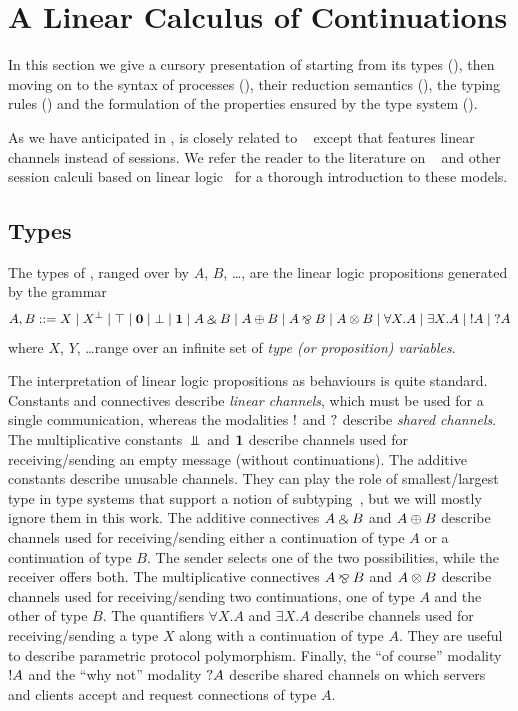 \section{A Linear Calculus of Continuations}
\label{sec:calculus}

In this section we give a cursory presentation of \Calculus starting from its
types (), then moving on to the syntax of processes
(), their reduction semantics (), the
typing rules () and the formulation of the properties
ensured by the type system ().

As we have anticipated in , \Calculus is closely related
to \CP~\citep{Wadler14,GayVasconcelos25} except that \Calculus features linear
channels instead of sessions.
%
We refer the reader to the literature on
\CP~\cite{Wadler14,LindleyMorris15,GayVasconcelos25} and other session calculi
based on linear logic~\cite{CairesPfenning10,CairesPfenningToninho16} for a
thorough introduction to these models.

\subsection{Types}
\label{sec:types}

The types of \Calculus, ranged over by $A$, $B$, \dots, are the linear logic
propositions generated by the grammar
\[
    A, B ::= X \mid \dual{X} \mid \Top \mid \Zero \mid \Bot \mid \One \mid A \With B \mid A \Plus B \mid A \Par B \mid A \Ten B \mid \forall X.A \mid \exists X.A \mid \OfCourse A \mid \WhyNot A
\]
where $X$, $Y$, \dots range over an infinite set of \emph{type (or proposition)
variables}.

The interpretation of linear logic propositions as behaviours is quite standard.
Constants and connectives describe \emph{linear channels}, which must be used
for a single communication, whereas the modalities $\OfCourse$ and $\WhyNot$
describe \emph{shared channels}.
%
The multiplicative constants $\Bot$ and $\mathbf{1}$ describe channels used for
receiving/sending an empty message (without continuations).
%
The additive constants describe unusable channels. They can play the role of
smallest/largest type in type systems that support a notion of
subtyping~\citep{HornePadovani24}, but we will mostly ignore them in this work.
%
The additive connectives $A \mathbin\binampersand B$ and $A \mathbin\oplus B$ describe  channels used for
receiving/sending either a continuation of type $A$ or a continuation of type
$B$. The sender selects one of the two possibilities, while the receiver offers
both.
%
The multiplicative connectives $A \mathbin\bindnasrepma B$ and $A \mathbin\otimes B$ describe channels used
for receiving/sending two continuations, one of type $A$ and the other of type
$B$.
%
The quantifiers $\forall X.A$ and $\exists X.A$ describe channels used for
receiving/sending a type $X$ along with a continuation of type $A$. They are
useful to describe parametric protocol polymorphism.
%
Finally, the ``of course'' modality $\OfCourse A$ and the ``why not'' modality
$\WhyNot A$ describe shared channels on which servers and clients accept and
request connections of type $A$.

